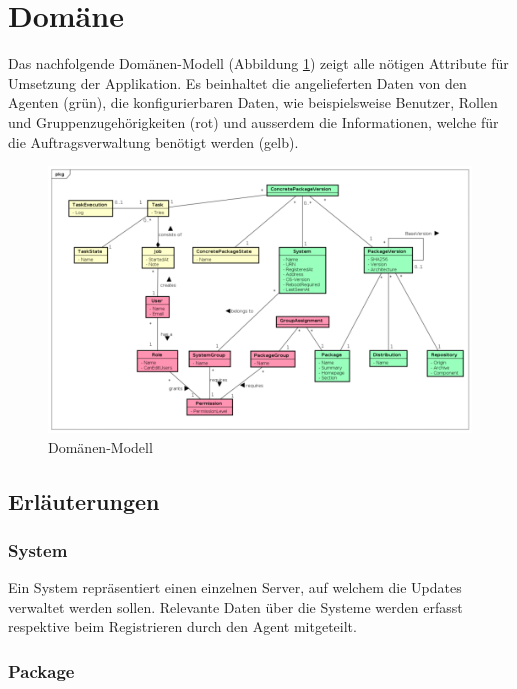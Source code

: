 \section{Domäne}

Das nachfolgende Domänen-Modell (Abbildung \ref{fig:domainmodel}) zeigt alle nötigen Attribute für Umsetzung der Applikation. Es beinhaltet die angelieferten Daten von den Agenten (grün), die konfigurierbaren Daten, wie beispielsweise Benutzer, Rollen und Gruppenzugehörigkeiten (rot) und ausserdem die Informationen, welche für die Auftragsverwaltung benötigt werden (gelb).

\begin{figure}
  \centering
    \includegraphics[width=\textwidth]{files/DomainModel_small}
  \caption{Domänen-Modell}
  \label{fig:domainmodel}
\end{figure}

\subsection*{Erläuterungen}

\subsubsection{System}

Ein System repräsentiert einen einzelnen Server, auf welchem die Updates verwaltet werden sollen. Relevante Daten über die Systeme werden erfasst respektive beim Registrieren durch den Agent mitgeteilt.

\subsubsection{Package}

